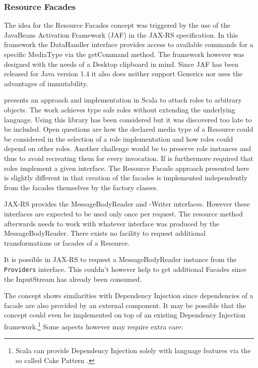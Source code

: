 \documentclass[11pt,a4paper,headsepline,twoside]{scrartcl}		%
\begin{document}
\subsubsection{Resource Facades}
\label{sec:resourcefacadesfuture-work}

The idea for the Resource Facades concept was triggered by the use of the
JavaBeans Activation Framework (JAF)\cite{Calder2006} in the JAX-RS
specification. In this framework the DataHandler interface provides access to
available commands for a specific MediaType via the getCommand method. The
framework however was designed with the needs of a Desktop clipboard in
mind. Since JAF has been released for Java version 1.4 it also does neither
support Generics nor uses the advantages of immutability.

\cite{Pradel2008a} presents an approach and implementation in Scala to attach
roles to arbitrary objects. The work achieves type safe roles without extending
the underlying language. Using this library has been considered but it was
discovered too late to be included. Open questions are how the declared media
type of a Resource could be considered in the selection of a role implementation
and how roles could depend on other roles. Another challenge would be to
preserve role instances and thus to avoid recreating them for every
invocation. If is furthermore required that roles implement a given
interface. The Resource Facade approach presented here is slightly different in
that creation of the facades is implemented independently from the facades
themselves by the factory classes.

JAX-RS provides the MessageBodyReader and -Writer interfaces. However these
interfaces are expected to be used only once per request. The resource method
afterwards needs to work with whatever interface was produced by the
MessageBodyReader. There exists no facility to request additional
transformations or facades of a Resource.

It is possible in JAX-RS to request a MessageBodyReader instance from the
\lstinline:Providers: interface. This couldn't however help to get additional
Facades since the InputStream has already been consumed.

The concept shows similarities with Dependency Injection since dependencies of a
facade are also provided by an external component. It may be possible that the
concept could even be implemented on top of an existing Dependency Injection
framework.\footnote{Scala can provide Dependency Injection solely with language
  features via the so called Cake Pattern \cite{Warski2011} \cite{Odersky2005}.}
 Some aspects however may require extra care:
\end{document}
